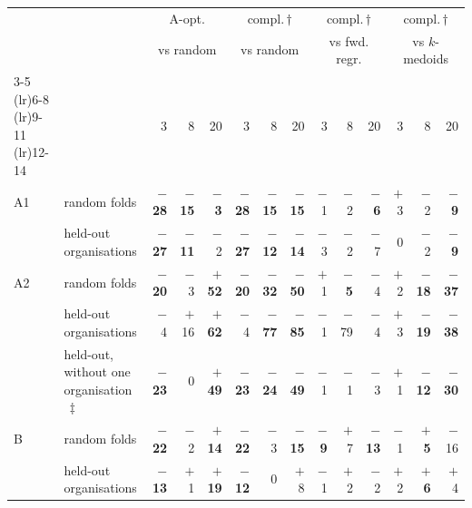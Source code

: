 \begin{tabular}{@{}ll@{\hspace{9pt}}rrr@{\hspace{9pt}}rrr@{\hspace{9pt}}rrr@{\hspace{9pt}}rrr@{}}
\toprule
& & \multicolumn{3}{c}{A-opt.} & \multicolumn{3}{c}{compl.\,$\dagger$} & \multicolumn{3}{c}{compl.\,$\dagger$} & \multicolumn{3}{c}{compl.\,$\dagger$} \\
& & \multicolumn{3}{c}{vs random} & \multicolumn{3}{c}{vs random} & \multicolumn{3}{c}{vs fwd. regr.} & \multicolumn{3}{c}{vs $k$-medoids} \\
\cmidrule(lr){3-5} \cmidrule(lr){6-8} \cmidrule(lr){9-11} \cmidrule(lr){12-14}
& & 3 & 8 & 20 & 3 & 8 & 20 & 3 & 8 & 20 & 3 & 8 & 20 \\
\midrule
A1 & random folds & \textbf{$-$28} & \textbf{$-$15} & \textbf{$-$3} & \textbf{$-$28} & \textbf{$-$15} & \textbf{$-$15} & $-$1 & $-$2 & \textbf{$-$6} & $+$3 & $-$2 & \textbf{$-$9} \\
 & held-out organisations & \textbf{$-$27} & \textbf{$-$11} & $-$2 & \textbf{$-$27} & \textbf{$-$12} & \textbf{$-$14} & $-$3 & $-$2 & $-$7 & 0 & $-$2 & \textbf{$-$9} \\
\addlinespace[2pt]
A2 & random folds & \textbf{$-$20} & $-$3 & \textbf{$+$52} & \textbf{$-$20} & \textbf{$-$32} & \textbf{$-$50} & $+$1 & \textbf{$-$5} & $-$4 & $+$2 & \textbf{$-$18} & \textbf{$-$37} \\
 & held-out organisations & $-$4 & $+$16 & \textbf{$+$62} & $-$4 & \textbf{$-$77} & \textbf{$-$85} & $-$1 & $-$79 & $-$4 & $+$3 & \textbf{$-$19} & \textbf{$-$38} \\
 & held-out, without one organisation$\,\ddagger$ & \textbf{$-$23} & 0 & \textbf{$+$49} & \textbf{$-$23} & \textbf{$-$24} & \textbf{$-$49} & $-$1 & $-$1 & $-$3 & $+$1 & \textbf{$-$12} & \textbf{$-$30} \\
\addlinespace[2pt]
B & random folds & \textbf{$-$22} & $-$2 & \textbf{$+$14} & \textbf{$-$22} & $-$3 & \textbf{$-$15} & \textbf{$-$9} & $+$7 & \textbf{$-$13} & $-$1 & \textbf{$+$5} & $-$16 \\
 & held-out organisations & \textbf{$-$13} & $+$1 & \textbf{$+$19} & \textbf{$-$12} & 0 & $+$8 & $-$1 & $+$2 & $-$2 & $+$2 & \textbf{$+$6} & $+$4 \\
\bottomrule
\end{tabular}
